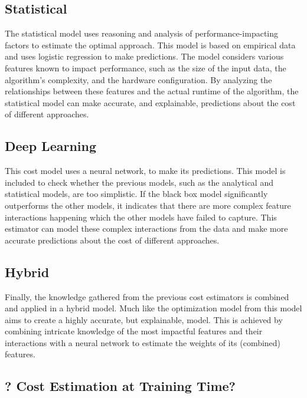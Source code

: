 \subsection{Statistical}
The statistical model uses reasoning and analysis of performance-impacting factors to estimate the optimal approach. This model is based on empirical data and uses logistic regression to make predictions. The model considers various features known to impact performance, such as the size of the input data, the algorithm's complexity, and the hardware configuration. By analyzing the relationships between these features and the actual runtime of the algorithm, the statistical model can make accurate, and explainable, predictions about the cost of different approaches.

\subsection{Deep Learning}
This cost model uses a neural network, to make its predictions. This model is included to check whether the previous models, such as the analytical and statistical models, are too simplistic. If the black box model significantly outperforms the other models, it indicates that there are more complex feature interactions happening which the other models have failed to capture. This estimator can model these complex interactions from the data and make more accurate predictions about the cost of different approaches.

\subsection{Hybrid}
Finally, the knowledge gathered from the previous cost estimators is combined and applied in a hybrid model. Much like the optimization model from \cite{halide_cost_model} this model aims to create a highly accurate, but explainable, model. This is achieved by combining intricate knowledge of the most impactful features and their interactions with a neural network to estimate the weights of its (combined) features.


\subsection{? Cost Estimation at Training Time?}
